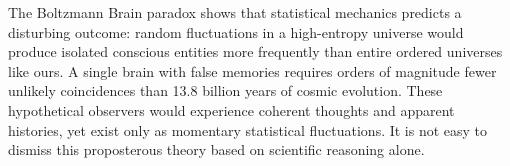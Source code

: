 The Boltzmann Brain paradox shows that statistical mechanics predicts a disturbing outcome: random fluctuations in a high-entropy universe would produce isolated conscious entities more frequently than entire ordered universes like ours. A single brain with false memories requires orders of magnitude fewer unlikely coincidences than 13.8 billion years of cosmic evolution. These hypothetical observers would experience coherent thoughts and apparent histories, yet exist only as momentary statistical fluctuations. It is not easy to dismiss this proposterous theory based on scientific reasoning alone.
